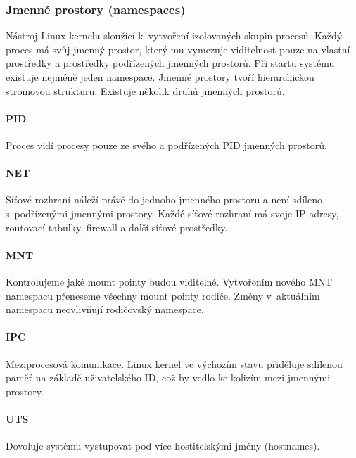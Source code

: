 \subsubsection{Jmenné prostory (namespaces)}

Nástroj Linux kernelu sloužící k~vytvoření izolovaných skupin procesů.
Každý proces má svůj jmenný prostor, který mu vymezuje viditelnost pouze na vlastní prostředky a prostředky podřízených jmenných prostorů.
Při startu systému existuje nejméně jeden namespace.
Jmenné prostory tvoří hierarchickou stromovou strukturu.
Existuje několik druhů jmenných prostorů.

\paragraph{PID}

Proces vidí procesy pouze ze svého a podřízených PID jmenných prostorů.
\cite{pid_namespaces}

\paragraph{NET}

Síťové rozhraní náleží právě do jednoho jmenného prostoru a není sdíleno s~podřízenými jmennými prostory.
Každé síťové rozhraní má svoje IP adresy, routovací tabulky, firewall a další síťové prostředky. 
\cite{namespaces}

\paragraph{MNT}

Kontrolujeme jaké mount pointy budou viditelné.
Vytvořením nového MNT namespacu přeneseme všechny mount pointy rodiče.
Změny v~aktuálním namespacu neovlivňují rodičovský namespace.
\cite{mnt_namespaces}

\paragraph{IPC}

Meziprocesová komunikace.
Linux kernel ve výchozím stavu přiděluje sdílenou paměť na základě uživatelského ID, což by vedlo ke kolizím mezi jmennými prostory.
\cite{namespaces}

\paragraph{UTS}

Dovoluje systému vystupovat pod více hostitelskými jmény (hostnames).
\cite{namespaces}

